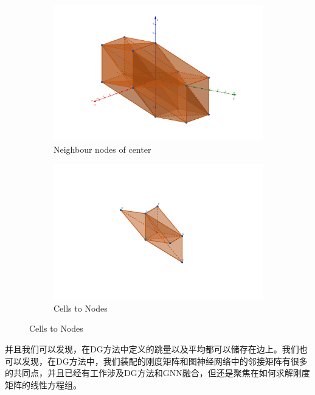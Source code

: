 \begin{figure}[H]
    \centering  
    \begin{subfigure}{0.5\textwidth}  
        \centering  
        \includegraphics[width=\textwidth]{./pics/final/adjacent.png}  
        \caption{Neighbour nodes of center}  
        \label{fig:sub2} 
    \end{subfigure}%
    \begin{subfigure}{0.5\textwidth}  
        \centering  
        \includegraphics[width=\textwidth]{./pics/final/3D.png}  
        \caption{Cells to Nodes}  
    \end{subfigure} 
\end{figure}
并且我们可以发现，在DG方法中定义的跳量以及平均都可以储存在边上。我们也可以发现，在DG方法中，我们装配的刚度矩阵和图神经网络中的邻接矩阵有很多的共同点，并且已经有工作涉及DG方法和GNN融合，但还是聚焦在如何求解刚度矩阵的线性方程组。


